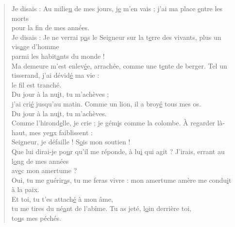 \begin{verse}
Je disais : Au milie\underline{u} de mes jours,\psalmstar
j\underline{e} m'en vais ; \psalmstar
j'ai ma place \underline{e}ntre les morts\\
pour la f\underline{i}n de mes années.\\

Je disais : Je ne verrai p\underline{a}s le Seigneur\psalmstar
sur la t\underline{e}rre des vivants, \psalmstar
plus un vis\underline{a}ge d'homme\\
parmi les habit\underline{a}nts du monde !\\

Ma demeure m'est enlev\underline{é}e, arrachée,\psalmstar
comme une t\underline{e}nte de berger. \psalmstar
Tel un tisserand, j'ai dévid\underline{é} ma vie :\\
le f\underline{i}l est tranché.\\

Du jour à la nu\underline{i}t, tu m'achèves ;\\
j'ai cri\underline{é} jusqu'au matin. \psalmstar
Comme un lion, il a broy\underline{é} tous mes os.\\
Du jour à la nu\underline{i}t, tu m'achèves.\\

Comme l'hirond\underline{e}lle, je crie ;\psalmstar
je gém\underline{i}s comme la colombe. \psalmstar
À regarder là-haut, mes ye\underline{u}x faiblissent :\\
Seigneur, je défaille ! S\underline{o}is mon soutien !\\

Que lui dirai-je po\underline{u}r qu'il me réponde,\psalmstar
à lu\underline{i} qui agit ? \psalmstar
J'irais, errant au l\underline{o}ng de mes années\\
av\underline{e}c mon amertume ?\\

Oui, tu me guérir\underline{a}s, tu me feras vivre : \psalmstar
mon amertume amère me condu\underline{i}t à la paix.\\

Et toi, tu t'es attach\underline{é} à mon âme,\\
tu me tires du né\underline{a}nt de l'abîme. \psalmstar
Tu as jeté, l\underline{o}in derrière toi,\\
to\underline{u}s mes péchés.\\


\end{verse}
